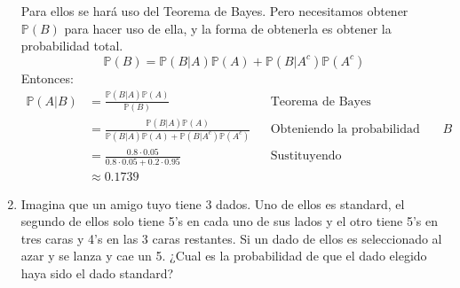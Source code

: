 \documentclass[11pt,letterpaper]{report}
\newcommand{\Pro}{\mathds{P}}
\begin{document}
\begin{enumerate}
Para ellos se hará uso del Teorema de Bayes. Pero necesitamos obtener $\Pro(B)$ para hacer uso de ella, y la forma de
obtenerla es obtener la probabilidad total.
\[
    \Pro(B) = \Pro(B | A) \Pro(A) + \Pro(B | A^c) \Pro(A^c)
\]
Entonces:
\begin{align*}
    \Pro(A | B)
        &= \frac{\Pro(B|A)\Pro(A)}{\Pro(B)} && \text{Teorema de Bayes}\\
        &= \frac{\Pro(B|A)\Pro(A)}{\Pro(B | A) \Pro(A) + \Pro(B | A^c) \Pro(A^c)} && \text{Obteniendo la probabilidad total de $B$}\\
        &= \frac{0.8 \cdot 0.05}{0.8 \cdot 0.05 + 0.2 \cdot 0.95} && \text{Sustituyendo}\\
        &\approx 0.1739
\end{align*}

\item Imagina que un amigo tuyo tiene 3 dados. Uno de ellos es standard, el segundo de ellos solo
tiene 5's en cada uno de sus lados y el otro tiene 5's en tres caras y 4's en las 3 caras restantes.
Si un dado de ellos es seleccionado al azar y se lanza y cae un 5. ¿Cual es la probabilidad de que
el dado elegido haya sido el dado standard?


\end{enumerate}
\end{document}
